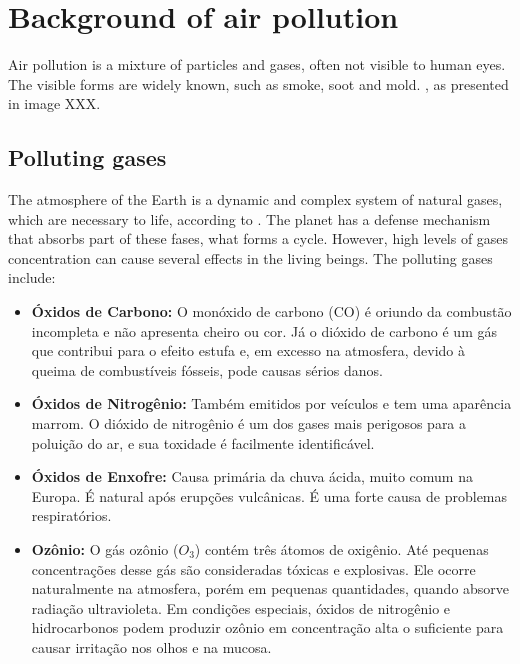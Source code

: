 \section{Background of air pollution}

Air pollution is a mixture of particles and gases, often not visible to human
eyes. The visible forms are widely known, such as smoke, soot and mold.
, as presented in image XXX.  

\subsection{Polluting gases}

The atmosphere of the Earth is a dynamic and complex system of natural gases,
which are necessary to life, according to \cite{gases}. The planet has a
defense mechanism that absorbs part of these fases, what forms a cycle.
However, high levels of gases concentration can cause several effects in the
living beings. The polluting gases include: 

\begin{itemize}
    \item \textbf{Óxidos de Carbono:} O monóxido de carbono (CO) é oriundo da
    combustão incompleta e não apresenta cheiro ou cor. Já o dióxido de
    carbono é um gás que contribui para o efeito estufa e, em excesso na
    atmosfera, devido à queima de combustíveis fósseis, pode causas sérios
    danos.  
    \item \textbf{Óxidos de Nitrogênio:} Também emitidos por veículos e
    tem uma aparência marrom. O dióxido de nitrogênio é um dos gases mais
    perigosos para a poluição do ar, e sua toxidade é facilmente
    identificável. 
    \item \textbf{Óxidos de Enxofre:} Causa primária da chuva ácida, muito
    comum na Europa. É natural após erupções vulcânicas. É uma forte causa de
    problemas respiratórios. 
    \item \textbf{Ozônio:} O gás ozônio ($O_3$) contém três átomos de oxigênio. Até pequenas
    concentrações desse gás são consideradas tóxicas e explosivas. Ele ocorre
    naturalmente na atmosfera, porém em pequenas quantidades, quando absorve
    radiação ultravioleta. Em condições especiais, óxidos de nitrogênio e
    hidrocarbonos podem produzir ozônio em concentração alta o suficiente para
    causar irritação nos olhos e na mucosa. 
\end{itemize}


